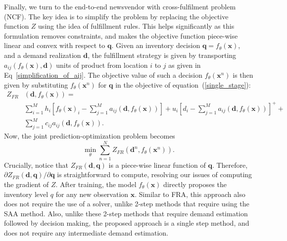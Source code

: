 \documentclass[poms,final,blindrev]{poms1_V1} %
\newcommand{\x}[0]{{\mathbf{x}}}
\newcommand{\q}[0]{{\mathbf{q}}}
\renewcommand{\d}[0]{{\mathbf{d}}}
\begin{document}
Finally, we turn to the end-to-end newsvendor with cross-fulfilment problem (NCF). The key idea is to simplify the problem by replacing the objective function $Z$ using the idea of fulfillment rules. This helps significantly as this formulation removes constraints, and makes the objective function piece-wise linear and convex with respect to $\q$. 
%
%
%
%
%
Given an inventory decision $\q = f_\theta(\x)$, and a demand realization $\d$, the fulfillment strategy is given by transporting $a_{ij}(f_\theta(\x), \d)$ units of product from location $i$ to $j$ as given in Eq~\ref{simplification_of_aij}. The objective value of such a decision $f_\theta(\x^n)$ is then given by substituting $f_\theta(\x^n)$ for $\q$ in the objective of equation~(\ref{single_stage}):
\begin{equation}
\begin{split}
Z_{FR}&(\d, f_\theta(\x)) = \\ & \sum_{i=1}^M h_i \left[ f_\theta(\x)_i - \sum_{j=1}^M a_{ij}(\d, f_\theta(\x)) \right] + u_i \left[ d_i - \sum_{j=1}^M {a_{ij}(\d, f_\theta(\x)) } \right]^+ + \\ & \sum_{j=1}^M c_{ij}a_{ij}(\d, f_\theta(\x)).
\end{split}    
\end{equation}
Now, the joint prediction-optimization problem becomes 
\begin{equation}
\label{end-to-end}
    \min_{\theta} \sum_{n = 1}^N Z_{FR}(\d^n, f_\theta(\x^n)).
\end{equation}
Crucially, notice that $Z_{FR}(\d, \q)$ is a piece-wise linear function of $\q$. Therefore, $\partial Z_{FR}(\d, \q) / \partial \q$ is straightforward to compute, resolving our issues of computing the gradient of $Z$. After training, the model $f_{\theta}(\x)$ directly proposes the inventory level $q$ for any new observation $\x$. Similar to FRA, this approach also does not require the use of a solver, unlike 2-step methods that require using the SAA method. Also, unlike these 2-step methods that require demand estimation followed by decision making, the proposed approach is a single step method, and does not require any intermediate demand estimation.
\end{document}
